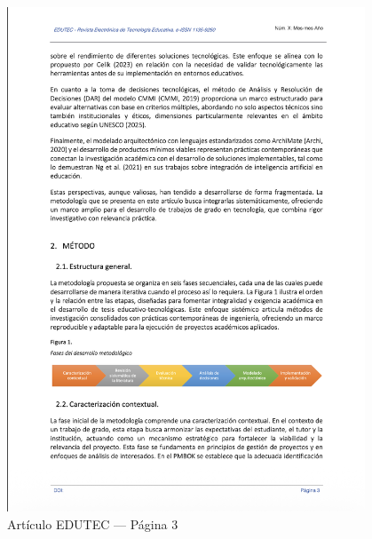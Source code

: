 \begin{figure}[H]
    \centering
    \begin{tcolorbox}[
        colback=white,
        colframe=gray!50,
        boxrule=1pt,
        arc=2pt,
        boxsep=5pt,
        left=3pt,
        right=3pt,
        top=3pt,
        bottom=3pt,
        drop shadow
    ]
        \includegraphics[width=0.95\textwidth,keepaspectratio]{apendices/EDUTEC/3.png}
    \end{tcolorbox}
    \caption{Artículo EDUTEC --- Página 3}\label{fig:edutec-pagina-3}
\end{figure}
\FloatBarrier

